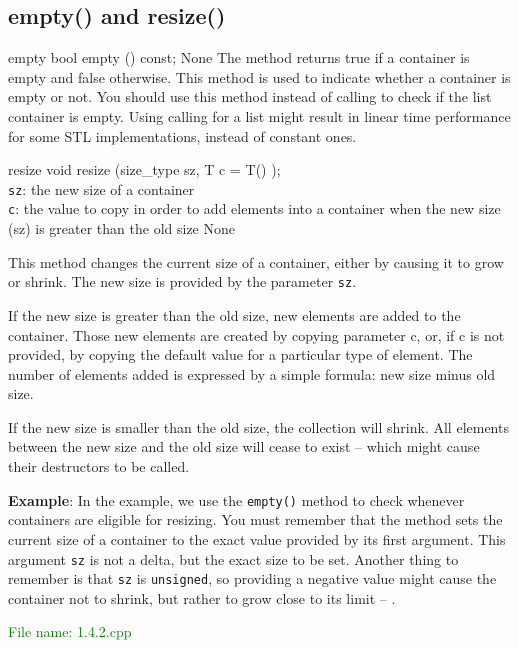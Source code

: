 
\subsection{empty() and resize()} %
\begin{methodinfo}
  {empty}
  {bool empty () const;}
  {None}
  {The method returns true if a container is empty and false otherwise.}
  {This method is used to indicate whether a container is empty or not. You should use this method 
  instead of calling  to check if the list container is empty. Using calling 
   for a list might result in linear time performance for some STL implementations, 
  instead of constant ones.}
\end{methodinfo}

\begin{methodinfo}
  {resize}
  {void resize (size_type sz, T c = T() );}
  {\\\texttt{sz}: the new size of a container\\
  \texttt{c}: the value to copy in order to add elements into a container when the new size (sz) 
  is greater than the old size}
  {None}
  {This method changes the current size of a container, either by causing it to grow or shrink. 
  The new size is provided by the parameter \texttt{sz}.

  If the new size is greater than the old size, new elements are added to the container. 
  Those new elements are created by copying parameter c, or, if c is not provided, by copying 
  the default value for a particular type of element. The number of elements added is expressed 
  by a simple formula: new size minus old size.

  If the new size is smaller than the old size, the collection will shrink. All elements between 
  the new size and the old size will cease to exist – which might cause their destructors to be called.}
\end{methodinfo}

\textbf{Example}: In the example, we use the \texttt{empty()} method to check whenever containers are 
eligible for resizing. You must remember that the  method sets the current 
size of a container to the exact value provided by its first argument. This argument \texttt{sz} is not 
a delta, but the exact size to be set. Another thing to remember is that \texttt{sz} is \texttt{unsigned}, 
so providing a negative value might cause the container not to shrink, but rather to grow close to its 
limit – .

\textcolor{green}{File name: 1.4.2.cpp}

